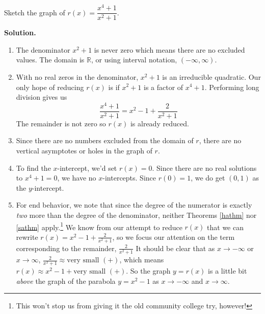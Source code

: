 \documentclass{ximera}
\begin{document}
\begin{example}   \label{carefulanalysisneeded} Sketch the graph of $r(x) = \dfrac{x^4+1}{x^2+1}$.

\smallskip

{\bf Solution.}

\begin{enumerate}

\item  The denominator $x^2+1$ is never zero which means there are no excluded values.  The domain is $\mathbb{R}$, or using interval notation,  $(-\infty, \infty)$.

\item  With no real zeros in the denominator, $x^2+1$ is an irreducible quadratic.  Our only hope of reducing $r(x)$ is if $x^2+1$ is a factor of $x^4+1$.  Performing long division gives us \[\frac{x^4+1}{x^2+1} = x^2-1+\frac{2}{x^2+1}\] The remainder is not zero so $r(x)$ is already reduced.

\item Since there are no numbers excluded from the domain of $r$, there are no vertical asymptotes or holes in the graph of $r$.

\item  To find the $x$-intercept, we'd set $r(x) = 0$.  Since there are no real solutions to $x^4+1=0$, we have no $x$-intercepts.  Since $r(0) = 1$, we do get $(0,1)$ as the $y$-intercept.

\item  For end behavior, we note that since the degree of the numerator is exactly \textit{two} more than the degree of the denominator, neither Theorems \ref{hathm} nor \ref{sathm} apply.\footnote{This won't stop us from giving it the old community college try, however!} We know from our attempt to reduce $r(x)$ that we can rewrite $r(x) = x^2-1+\frac{2}{x^2+1}$, so we focus our attention on the term corresponding to the remainder, $\frac{2}{x^2+1}$  It should be clear that as $x \rightarrow - \infty$ or $x \rightarrow \infty$, $\frac{2}{x^2+1} \approx \text{very small $(+)$}$, which means $r(x) \approx x^2-1 + \text{very small $(+)$}$.  So the graph $y=r(x)$ is a little bit \textit{above} the graph of the parabola $y=x^2-1$ as $x \rightarrow  -\infty$ and $x \rightarrow \infty$. 



\end{enumerate}
\end{example}
\end{document}
